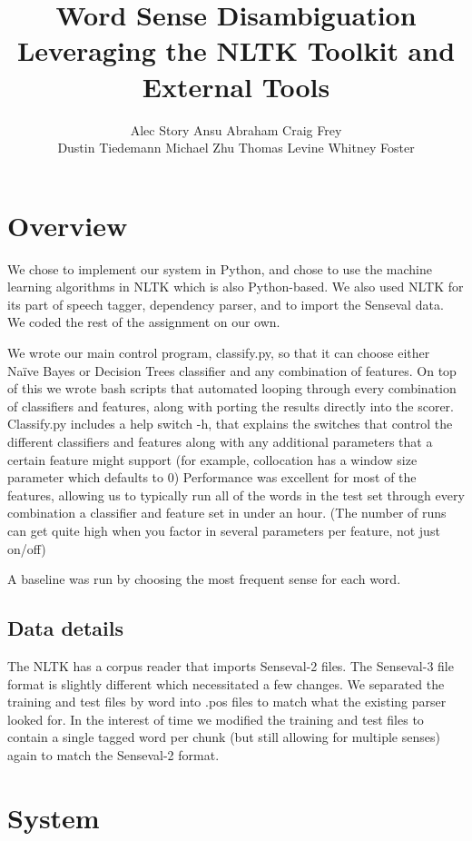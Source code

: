 \documentclass{article}
\title{Word Sense Disambiguation\\
\small{Leveraging the NLTK Toolkit and External Tools}}
\author{
Alec Story
Ansu Abraham
Craig Frey\\
Dustin Tiedemann
Michael Zhu
Thomas Levine
Whitney Foster\\
}
\newcommand{\Naive}{Na\"ive}
\begin{document}
\maketitle

\section{Overview}

We  chose to implement our system in Python, and chose to use the machine
learning algorithms in NLTK which is also Python-based.  We also used NLTK for
its part of speech tagger, dependency parser, and to import the Senseval data.
We coded the rest of the assignment on our own.

We wrote our main control program, classify.py, so that it can choose either
\Naive{} Bayes or Decision Trees classifier and any 
combination of  features. On top of this we wrote bash scripts that automated
looping through every combination of classifiers and features, along with
porting the results directly into the scorer.  Classify.py includes a help
switch -h, that explains the switches that control the different classifiers
and features along with any additional parameters that a certain feature might
support (for example, collocation has a window size parameter which defaults to
0) Performance was excellent for most of the features, allowing us to typically
run all of the words in the test set through every combination a classifier and
feature set in under an hour. (The number of runs can get quite high when you
factor in several parameters per feature, not just on/off)

A baseline was run by choosing the most frequent sense for each word.

\subsection{Data details}

The NLTK has a corpus reader that imports Senseval-2 files. The Senseval-3
file format is slightly  different which necessitated a few changes. We
separated the training  and test files by word into .pos files to match  what
the existing parser looked for. In the interest of time we modified  the
training and test files to contain a single tagged word per chunk (but still
allowing for multiple senses) again to match the Senseval-2  format.


\section{System}
\end{document}
